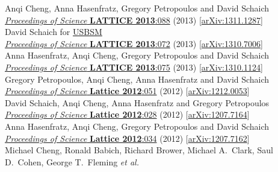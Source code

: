 \begin{spacelistout}
\begin{revnumerate}
      Anqi Cheng, Anna Hasenfratz, Gregory Petropoulos and David Schaich \\
      \href{https://doi.org/10.22323/1.187.0088}{\textit{Proceedings of Science} \textbf{LATTICE 2013}:088} (2013) [\href{http://arxiv.org/abs/1311.1287}{arXiv:1311.1287}]
    \pagebreakitem
       \\
      David Schaich for \href{http://bsm.physics.yale.edu}{USBSM} \\
      \href{https://doi.org/10.22323/1.187.0072}{\textit{Proceedings of Science} \textbf{LATTICE 2013}:072} (2013) [\href{http://arxiv.org/abs/1310.7006}{arXiv:1310.7006}]
    \pagebreakitem
       \\
      Anna Hasenfratz, Anqi Cheng, Gregory Petropoulos and David Schaich \\
      \href{https://doi.org/10.22323/1.187.0075}{\textit{Proceedings of Science} \textbf{LATTICE 2013}:075} (2013) [\href{http://arxiv.org/abs/1310.1124}{arXiv:1310.1124}]
    \pagebreakitem
       \\
      Gregory Petropoulos, Anqi Cheng, Anna Hasenfratz and David Schaich \\
      \href{https://doi.org/10.22323/1.164.0051}{\textit{Proceedings of Science} \textbf{Lattice 2012}:051} (2012) [\href{http://arxiv.org/abs/1212.0053}{arXiv:1212.0053}]
    \pagebreakitem
       \\
      David Schaich, Anqi Cheng, Anna Hasenfratz and Gregory Petropoulos \\
      \href{https://doi.org/10.22323/1.164.0028}{\textit{Proceedings of Science} \textbf{Lattice 2012}:028} (2012) [\href{http://arxiv.org/abs/1207.7164}{arXiv:1207.7164}]
    \pagebreakitem
       \\
      Anna Hasenfratz, Anqi Cheng, Gregory Petropoulos and David Schaich \\
      \href{https://doi.org/10.22323/1.164.0034}{\textit{Proceedings of Science} \textbf{Lattice 2012}:034} (2012) [\href{http://arxiv.org/abs/1207.7162}{arXiv:1207.7162}]
    \pagebreakitem
       \\
      Michael Cheng, Ronald Babich, Richard Brower, Michael A.~Clark, Saul D.~Cohen, George T.~Fleming \textit{et al.} \\

\end{revnumerate}
\end{spacelistout}
